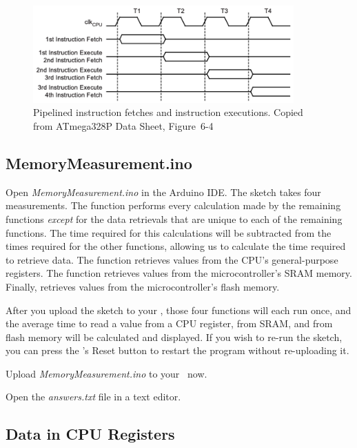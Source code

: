 \begin{figure}
    \centering
    \includegraphics[width=10cm]{ATmega328P_PipelineTiming}
    \caption{Pipelined instruction fetches and instruction executions. \tiny Copied from ATmega328P Data Sheet, Figure~6-4 \label{fig:pipelining}}
\end{figure}

\subsection{MemoryMeasurement.ino}

Open \textit{MemoryMeasurement.ino} in the Arduino IDE. The sketch takes four
measurements. The  function performs every
calculation made by the remaining functions \textit{except} for the data
retrievals that are unique to each of the remaining functions. The time
required for this calculations will be subtracted from the times required for
the other functions, allowing us to calculate the time required to retrieve
data. The  function retrieves values from the
CPU's general-purpose registers. The  function
retrieves values from the microcontroller's SRAM memory. Finally,
 retrieves values from the microcontroller's
flash memory.

After you upload the sketch to your \nano, those four functions will each run
once, and the average time to read a value from a CPU register, from SRAM, and
from flash memory will be calculated and displayed. If you wish to re-run the
sketch, you can press the \nano's Reset button to restart the program without
re-uploading it.

Upload \textit{MemoryMeasurement.ino} to your \nano\ now.

\vspace{.5cm}

Open the \textit{answers.txt} file in a text editor.

\subsection{Data in CPU Registers}

